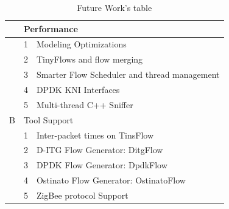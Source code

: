 \begin{table}[!ht]
\centering
\caption{Future Work's table}
\label{tab:future-works}
\begin{tabular}{lll}
\hline
\rowcolor[HTML]{9B9B9B} 
\multicolumn{1}{c}{\cellcolor[HTML]{9B9B9B}A} & \multicolumn{2}{l}{\cellcolor[HTML]{9B9B9B}Performance}                                                         \\ \hline
                                              & 1                          & Modeling Optimizations                                                             \\
                                              & \cellcolor[HTML]{EFEFEF}2  & \cellcolor[HTML]{EFEFEF}TinyFlows and flow merging                                 \\
                                              & 3                          & Smarter Flow Scheduler and thread management                                       \\
                                              & \cellcolor[HTML]{EFEFEF}4  & \cellcolor[HTML]{EFEFEF}DPDK KNI Interfaces                                        \\
                                              & 5                          & Multi-thread C++ Sniffer                                                           \\ \hline
\rowcolor[HTML]{9B9B9B} 
B                                             & \multicolumn{2}{l}{\cellcolor[HTML]{9B9B9B}Tool Support}                                                        \\ \hline
                                              & 1                          & Inter-packet times on TinsFlow                                                     \\
                                              & \cellcolor[HTML]{EFEFEF}2  & \cellcolor[HTML]{EFEFEF}D-ITG Flow Generator: DitgFlow                             \\
                                              & 3                          & DPDK Flow Generator: DpdkFlow                                                      \\
                                              & \cellcolor[HTML]{EFEFEF}4  & \cellcolor[HTML]{EFEFEF}Ostinato Flow Generator: OstinatoFlow                      \\
                                              & 5                          & ZigBee protocol Support                                                            \\ \hline

\end{tabular}
\end{table}

